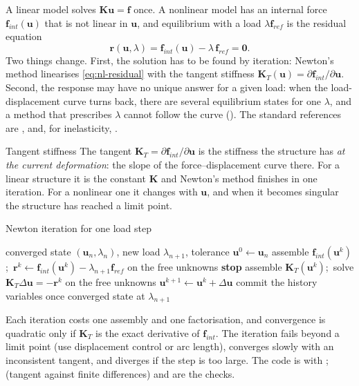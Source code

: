 A linear model solves $\bm K\bm u=\bm f$ once. A nonlinear model has an internal force $\bm f_{int}(\bm u)$ that is not linear in $\bm u$, and equilibrium with a load $\lambda\bm f_{ref}$ is the residual equation
\begin{equation}\label{eq:nl-residual}
\bm r(\bm u,\lambda)=\bm f_{int}(\bm u)-\lambda\,\bm f_{ref}=\bm 0 .
\end{equation}
Two things change. First, the solution has to be found by iteration: Newton's method linearises \eqref{eq:nl-residual} with the tangent stiffness $\bm K_T(\bm u)=\partial\bm f_{int}/\partial\bm u$. Second, the response may have no unique answer for a given load: when the load-displacement curve turns back, there are several equilibrium states for one $\lambda$, and a method that prescribes $\lambda$ cannot follow the curve (). The standard references are \citet{zienkiewicz2013fem}, \citet{bathe2014fep} and, for inelasticity, \citet{simo1998inelasticity}.

\begin{sidenote}{Tangent stiffness}
The tangent $\bm K_T=\partial\bm f_{int}/\partial\bm u$ is the stiffness the structure has \emph{at the current deformation}: the slope of the force--displacement curve there. For a linear structure it is the constant $\bm K$ and Newton's method finishes in one iteration. For a nonlinear one it changes with $\bm u$, and when it becomes singular the structure has reached a limit point.
\end{sidenote}

\begin{algbox}{Newton iteration for one load step}
\begin{pseudo}
\Require converged state $(\bm u_n,\lambda_n)$, new load $\lambda_{n+1}$, tolerance
\State $\bm u^0\gets\bm u_n$
  \State assemble $\bm f_{int}(\bm u^k)$;\ $\bm r^k\gets\bm f_{int}(\bm u^k)-\lambda_{n+1}\bm f_{ref}$ on the free unknowns
   \textbf{stop} \EndIf
  \State assemble $\bm K_T(\bm u^k)$;\ solve $\bm K_T\Delta\bm u=-\bm r^k$ on the free unknowns
  \State $\bm u^{k+1}\gets\bm u^k+\Delta\bm u$ 
\EndFor
\State commit the history variables once
\Ensure converged state at $\lambda_{n+1}$
\end{pseudo}
\end{algbox}

Each iteration costs one assembly and one factorisation, and convergence is quadratic only if $\bm K_T$ is the exact derivative of $\bm f_{int}$. The iteration fails beyond a limit point (use displacement control or arc length), converges slowly with an inconsistent tangent, and diverges if the step is too large. The code is  with ;  (tangent against finite differences) and  are the checks.


